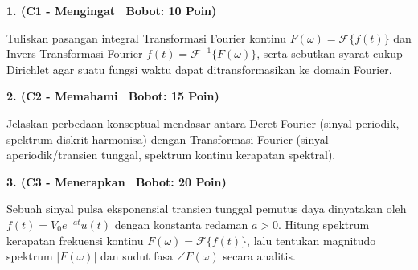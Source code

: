 \documentclass[10pt,a4paper]{article}
\begin{document}
\par
\vspace{1mm}

\noindent\textbf{1. (C1 - Mengingat \textbar\ Bobot: 10 Poin)}\par\vspace{0.8mm}
{\footnotesize Tuliskan pasangan integral Transformasi Fourier kontinu $F(\omega) = \mathcal{F}\{f(t)\}$ dan Invers Transformasi Fourier $f(t) = \mathcal{F}^{-1}\{F(\omega)\}$, serta sebutkan syarat cukup Dirichlet agar suatu fungsi waktu dapat ditransformasikan ke domain Fourier.}\par

\vspace{2.5mm}

\noindent\textbf{2. (C2 - Memahami \textbar\ Bobot: 15 Poin)}\par\vspace{0.8mm}
{\footnotesize Jelaskan perbedaan konseptual mendasar antara Deret Fourier (sinyal periodik, spektrum diskrit harmonisa) dengan Transformasi Fourier (sinyal aperiodik/transien tunggal, spektrum kontinu kerapatan spektral).}\par

\vspace{2.5mm}

\noindent\textbf{3. (C3 - Menerapkan \textbar\ Bobot: 20 Poin)}\par\vspace{0.8mm}
\noindent\begin{minipage}[t]{0.60\textwidth}%
  {\footnotesize Sebuah sinyal pulsa eksponensial transien tunggal pemutus daya dinyatakan oleh $f(t) = V_0 e^{-a t} u(t)$ dengan konstanta redaman $a > 0$. Hitung spektrum kerapatan frekuensi kontinu $F(\omega) = \mathcal{F}\{f(t)\}$, lalu tentukan magnitudo spektrum $|F(\omega)|$ dan sudut fasa $\angle F(\omega)$ secara analitis.}%
\end{minipage}%
\hfill%
\begin{minipage}[t]{0.37\textwidth}%
  \centering
\end{minipage}\par
\end{document}
